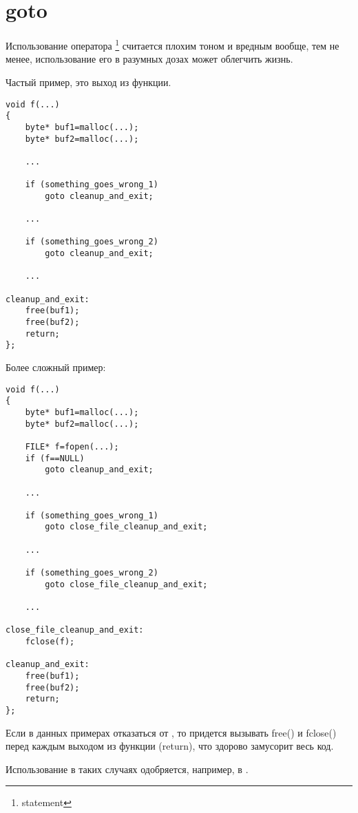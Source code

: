﻿\section{goto}

Использование оператора \footnote{statement} считается плохим тоном и вредным вообще\cite{Dijkstra:1968:LEG:362929.362947}\cite{Dijkstra:1979:GSC:1241515.1241518}, 
тем не менее, использование его в разумных дозах\cite{Knuth:1974:SPG:356635.356640} может облегчить жизнь.

Частый пример, это выход из функции.

\begin{lstlisting}
void f(...)
{
	byte* buf1=malloc(...);
	byte* buf2=malloc(...);

	...

	if (something_goes_wrong_1)
		goto cleanup_and_exit;

	...
	
	if (something_goes_wrong_2)
		goto cleanup_and_exit;

	...

cleanup_and_exit:
	free(buf1);
	free(buf2);
	return;
};
\end{lstlisting}

Более сложный пример:

\begin{lstlisting}
void f(...)
{
	byte* buf1=malloc(...);
	byte* buf2=malloc(...);

	FILE* f=fopen(...);
	if (f==NULL)
		goto cleanup_and_exit;

	...

	if (something_goes_wrong_1)
		goto close_file_cleanup_and_exit;

	...
	
	if (something_goes_wrong_2)
		goto close_file_cleanup_and_exit;

	...

close_file_cleanup_and_exit:
	fclose(f);

cleanup_and_exit:
	free(buf1);
	free(buf2);
	return;
};
\end{lstlisting}

Если в данных примерах отказаться от , то придется вызывать free() и fclose() перед каждым
выходом из функции (return), что здорово замусорит весь код.

Использование  в таких случаях одобряется, например, в \cite{LinuxKernelCodingStyle}.

